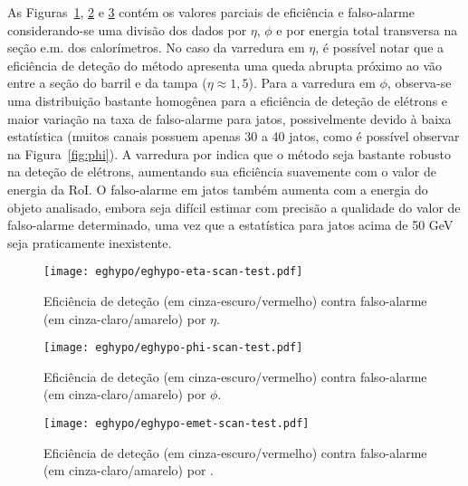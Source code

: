 As Figuras~\ref{fig:eghypo-eta-scan-test}, \ref{fig:eghypo-phi-scan-test} e
\ref{fig:eghypo-emet-scan-test} contém os valores parciais de eficiência e
falso-alarme considerando-se uma divisão dos dados por $\eta$, $\phi$ e por
energia total transversa na seção e.m. dos calorímetros. No caso da varredura
em $\eta$, é possível notar que a eficiência de deteção do método apresenta
uma queda abrupta próximo ao vão entre a seção do barril e da tampa ($\eta
\approx 1,5$). Para a varredura em $\phi$, observa-se uma distribuição
bastante homogênea para a eficiência de deteção de elétrons e maior variação
na taxa de falso-alarme para jatos, possivelmente devido à baixa estatística
(muitos canais possuem apenas 30 a 40 jatos, como é possível observar na
Figura~\ref{fig:phi}). A varredura por \etem indica que o método seja bastante
robusto na deteção de elétrons, aumentando sua eficiência suavemente com o
valor de energia da RoI. O falso-alarme em jatos também aumenta com a energia
do objeto analisado, embora seja difícil estimar com precisão a qualidade do
valor de falso-alarme determinado, uma vez que a estatística para jatos acima
de 50 GeV seja praticamente inexistente.

\begin{figure}
\begin{center}
\texttt{[image: eghypo/eghypo-eta-scan-test.pdf]}
\end{center}
\caption{Eficiência de deteção (em cinza-escuro/vermelho) contra
falso-alarme (em cinza-claro/amarelo) por $\eta$.}
\label{fig:eghypo-eta-scan-test}
\end{figure}

\begin{figure}
\begin{center}
\texttt{[image: eghypo/eghypo-phi-scan-test.pdf]}
\end{center}
\caption{Eficiência de deteção (em cinza-escuro/vermelho) contra
falso-alarme (em cinza-claro/amarelo) por $\phi$.}
\label{fig:eghypo-phi-scan-test}
\end{figure}

\begin{figure}
\begin{center}
\texttt{[image: eghypo/eghypo-emet-scan-test.pdf]}
\end{center}
\caption{Eficiência de deteção (em cinza-escuro/vermelho) contra
falso-alarme (em cinza-claro/amarelo) por \etem.}
\label{fig:eghypo-emet-scan-test}
\end{figure}

